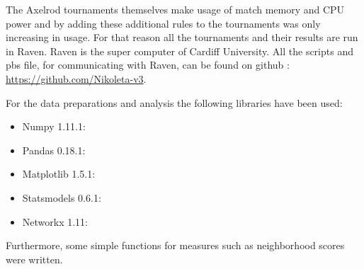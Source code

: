 


The Axelrod tournaments themselves make usage of match memory and CPU power and
by adding these additional rules to the tournaments was only increasing in usage.
For that reason all the tournaments and their results are run in Raven.
Raven is the super computer of Cardiff University. All the scripts and pbs file, for
communicating with Raven, can be found on github :
\url{https://github.com/Nikoleta-v3}.

For the data preparations and analysis the following libraries have been used:
\begin{multicols}{2}
  \begin{itemize}
    \item Numpy 1.11.1:
    \item Pandas 0.18.1:
    \item Matplotlib 1.5.1:
    \item Statsmodels 0.6.1:
    \item Networkx 1.11:
  \end{itemize}
\end{multicols}

Furthermore, some simple functions for measures such as neighborhood scores
were written.



